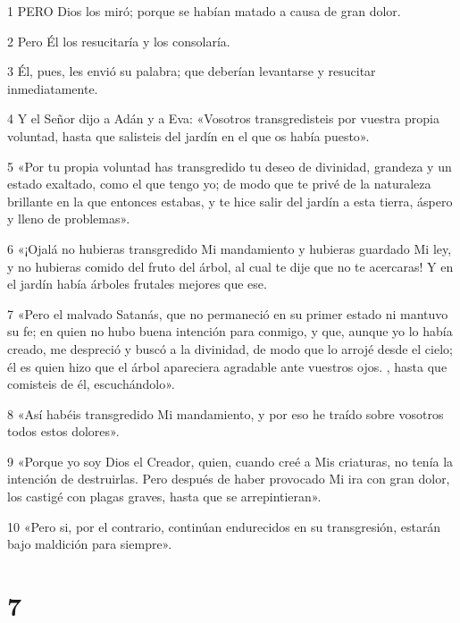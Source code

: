 \par 1 PERO Dios los miró; porque se habían matado a causa de gran dolor.

\par 2 Pero Él los resucitaría y los consolaría.

\par 3 Él, pues, les envió su palabra; que deberían levantarse y resucitar inmediatamente.

\par 4 Y el Señor dijo a Adán y a Eva: «Vosotros transgredisteis por vuestra propia voluntad, hasta que salisteis del jardín en el que os había puesto».

\par 5 «Por tu propia voluntad has transgredido tu deseo de divinidad, grandeza y un estado exaltado, como el que tengo yo; de modo que te privé de la naturaleza brillante en la que entonces estabas, y te hice salir del jardín a esta tierra, áspero y lleno de problemas».

\par 6 «¡Ojalá no hubieras transgredido Mi mandamiento y hubieras guardado Mi ley, y no hubieras comido del fruto del árbol, al cual te dije que no te acercaras! Y en el jardín había árboles frutales mejores que ese.

\par 7 «Pero el malvado Satanás, que no permaneció en su primer estado ni mantuvo su fe; en quien no hubo buena intención para conmigo, y que, aunque yo lo había creado, me despreció y buscó a la divinidad, de modo que lo arrojé desde el cielo; él es quien hizo que el árbol apareciera agradable ante vuestros ojos. , hasta que comisteis de él, escuchándolo».

\par 8 «Así habéis transgredido Mi mandamiento, y por eso he traído sobre vosotros todos estos dolores».

\par 9 «Porque yo soy Dios el Creador, quien, cuando creé a Mis criaturas, no tenía la intención de destruirlas. Pero después de haber provocado Mi ira con gran dolor, los castigé con plagas graves, hasta que se arrepintieran».

\par 10 «Pero si, por el contrario, continúan endurecidos en su transgresión, estarán bajo maldición para siempre».

\chapter{7}

